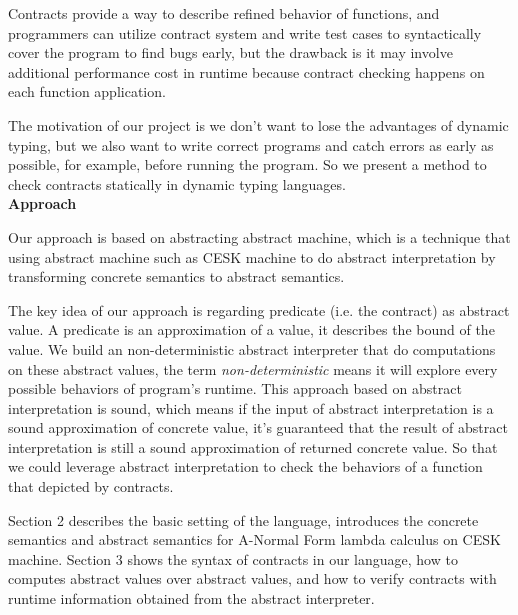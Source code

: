 \documentclass[paper=a4, fontsize=11pt]{scrartcl} %
\numberwithin{equation}{section} %
\numberwithin{figure}{section} %
\numberwithin{table}{section} %
\begin{document}
Contracts provide a way to describe refined behavior of functions, and programmers can utilize contract system and write test cases to syntactically cover the program to find bugs early, but the drawback is it may involve additional performance cost in runtime because contract checking happens on each function application.

The motivation of our project is we don't want to lose the advantages of dynamic typing, but we also want to write correct programs and catch errors as early as possible, for example, before running the program. So we present a method to check contracts statically in dynamic typing languages. \\

\textbf{Approach}

Our approach is based on abstracting abstract machine\cite{VanHorn:2010:AAM:1863543.1863553}, which is a technique that using abstract machine such as CESK machine\cite{felleisen1986control} to do abstract interpretation by transforming concrete semantics to abstract semantics. 

The key idea of our approach is regarding predicate (i.e. the contract) as abstract value. A predicate is an approximation of a value, it describes the bound of the value. We build an non-deterministic abstract interpreter that do computations on these abstract values, the term \textit{non-deterministic} means it will explore every possible behaviors of program's runtime. This approach based on abstract interpretation is sound, which means if the input of abstract interpretation is a sound approximation of concrete value, it's guaranteed that the result of abstract interpretation is still a sound approximation of returned concrete value. So that we could leverage abstract interpretation to check the behaviors of a function that depicted by contracts.

Section 2 describes the basic setting of the language, introduces the concrete semantics and abstract semantics for A-Normal Form lambda calculus on CESK machine. Section 3 shows the syntax of contracts in our language, how to computes abstract values over abstract values, and how to verify contracts with runtime information obtained from the abstract interpreter. \\
\end{document}
